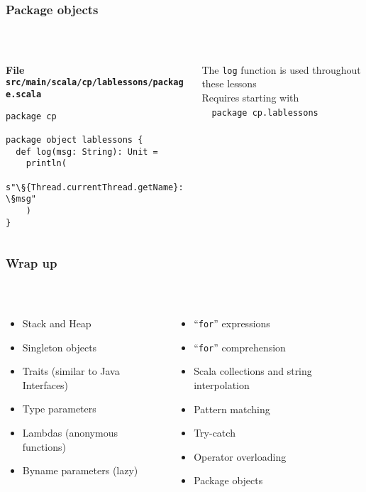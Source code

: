 \documentclass[aspectratio=169]{beamer}
\begin{document}
\begin{frame}[fragile]\frametitle{Package objects}
~\\[-8mm]
\begin{columns}
\begin{column}{0.62\textwidth}
\alert{\textbf{File \texttt{src/main/scala/cp/lablessons/package.scala}}}
\begin{lstlisting}[emph={log}]
package cp

package object lablessons {
  def log(msg: String): Unit =
    println(
      s"\§{Thread.currentThread.getName}: \§msg"
    )
}
\end{lstlisting}
\end{column}
\begin{column}{0.40\textwidth}
The \texttt{log} function is used throughout these lessons
\\[4mm]
Requires starting with\\~~\texttt{package cp.lablessons}
\end{column}
\end{columns}
\end{frame}


\begin{frame}\frametitle{Wrap up}
~\\[-8mm]
\begin{columns}
\begin{column}{0.48\textwidth}
\begin{itemize}
  \item Stack and Heap
  \item Singleton objects
  \item Traits (similar to Java Interfaces)
  \item Type parameters
  \item Lambdas (anonymous functions)
  \item Byname parameters (lazy)
\end{itemize}
\end{column}
\begin{column}{0.54\textwidth}
\begin{itemize}
  \item ``\texttt{for}'' expressions
  \item ``\texttt{for}'' comprehension
  \item Scala collections and string interpolation
  \item Pattern matching
  \item Try-catch
  \item Operator overloading
  \item Package objects
\end{itemize}
\end{column}
\end{columns}

    


\end{frame}
\end{document}
